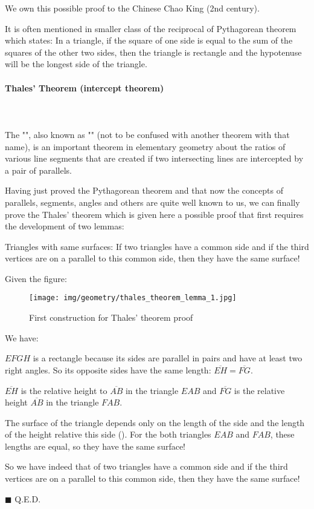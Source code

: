 	\begin{tcolorbox}[title=Remark,colframe=black,arc=10pt]
	We own this possible proof to the Chinese Chao King (2nd century).
	\end{tcolorbox}
	It is often mentioned in smaller class of the reciprocal of Pythagorean theorem which states: In a triangle, if the square of one side is equal to the sum of the squares of the other two sides, then the triangle is rectangle and the hypotenuse will be the longest side of the triangle.
	
	\paragraph{Thales' Theorem (intercept theorem)}\mbox{}\\\\
	The "", also known as "\label{thales theorem}" (not to be confused with another theorem with that name), is an important theorem in elementary geometry about the ratios of various line segments that are created if two intersecting lines are intercepted by a pair of parallels.
	
	Having just proved the Pythagorean theorem and that now the concepts of parallels, segments, angles and others are quite well known to us, we can finally prove the Thales' theorem which is given here a possible proof that first requires the development of two lemmas:
	\begin{lemma}
	 Triangles with same surfaces: If two triangles have a common side and if the third vertices are on a parallel to this common side, then they have the same surface!
	\end{lemma}
	\begin{dem}
	Given the figure:
	\begin{figure}[H]
		\centering
		\texttt{[image: img/geometry/thales\_theorem\_lemma\_1.jpg]}
		\caption[]{First construction for Thales' theorem proof}
	\end{figure}
	We have:
	
	$EFGH$ is a rectangle because its sides are parallel in pairs and have at least two right angles. So its opposite sides have the same length: $\overline{EH} = \overline{FG}$.
	
	$\overline{EH}$ is the relative height to $\overline{AB}$ in the triangle $EAB$ and $\overline{FG}$ is the relative height $\overline{AB}$ in the triangle $FAB$.
	
	The surface of the triangle depends only on the length of the side and the length of the height relative this side (). For the both triangles $EAB$ and $FAB$, these lengths are equal, so they have the same surface!
	
	So we have indeed that of two triangles have a common side and if the third vertices are on a parallel to this common side, then they have the same surface!
	\begin{flushright}
		$\blacksquare$  Q.E.D.
	\end{flushright}
	\end{dem}
	
